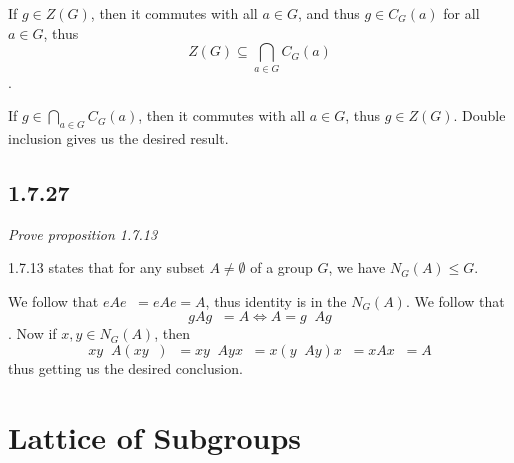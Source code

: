 \documentclass[11pt,oneside,titlepage]{book}
\DeclareMathOperator \inv {^{-1}}
\begin{document}
If $g \in Z(G)$, then it commutes with all $a \in G$, and thus $g \in C_G(a)$ for all $a \in G$,
thus $$Z(G) \subseteq \bigcap_{a \in G}{C_G(a)}$$.

If $g \in \bigcap_{a \in G}{C_G(a)}$,  then it commutes with all $a \in G$, thus $g \in Z(G)$. Double
inclusion gives us the desired result.

\subsection*{1.7.27}

\textit{Prove proposition 1.7.13}

1.7.13 states that for any subset $A \neq \emptyset$ of a group $G$, we have $N_G(A) \leq G$.

We follow that $eAe\inv = eAe = A$, thus identity is in the $N_G(A)$. We follow that
$$gAg\inv = A \iff A = g\inv A g$$. Now if $x, y \in N_G(A)$,
then $$xy\inv A (xy\inv)\inv = x y\inv A y x \inv =  x (y\inv A y) x \inv = x A x\inv = A$$
thus getting us the desired conclusion.

\section{Lattice of Subgroups}
\end{document}
